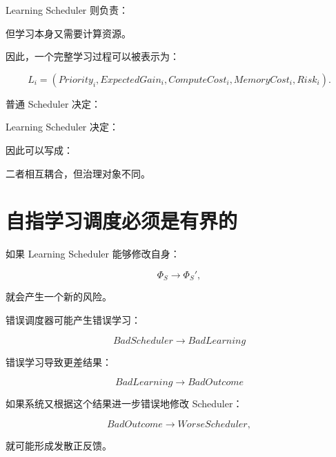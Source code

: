 Learning Scheduler 则负责：

\begin{statementbox}
\centering
{}
\end{statementbox}

但学习本身又需要计算资源。

因此，一个完整学习过程可以被表示为：

\[
L_i
=
(
Priority_i,
ExpectedGain_i,
ComputeCost_i,
MemoryCost_i,
Risk_i
).
\]

普通 Scheduler 决定：

\begin{statementbox}
\centering
{}
\end{statementbox}

Learning Scheduler 决定：

\begin{statementbox}
\centering
{}
\end{statementbox}

因此可以写成：

\begin{statementbox}
\centering
{}
\end{statementbox}

二者相互耦合，但治理对象不同。


\section{自指学习调度必须是有界的}

如果 Learning Scheduler 能够修改自身：

\[
\Phi_S
\rightarrow
\Phi_S',
\]

就会产生一个新的风险。

错误调度器可能产生错误学习：

\[
BadScheduler
\rightarrow
BadLearning
\]

错误学习导致更差结果：

\[
BadLearning
\rightarrow
BadOutcome
\]

如果系统又根据这个结果进一步错误地修改 Scheduler：

\[
BadOutcome
\rightarrow
WorseScheduler,
\]

就可能形成发散正反馈。

